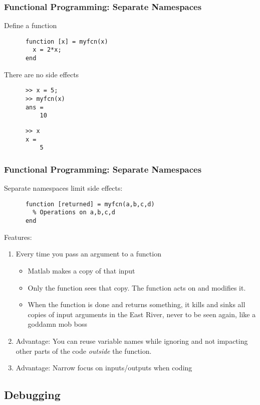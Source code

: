\documentclass{beamer}
\begin{document}
  \begin{frame}[fragile]
    \frametitle{Functional Programming: Separate Namespaces}

    Define a function
    \begin{lstlisting}
      function [x] = myfcn(x)
        x = 2*x;
      end
    \end{lstlisting}\pause
    There are no side effects
    \begin{lstlisting}
      >> x = 5;
      >> myfcn(x)
      ans =
          10
    \end{lstlisting}\pause
    \begin{lstlisting}
      >> x
      x =
          5
    \end{lstlisting}
	\end{frame}

  \begin{frame}[fragile]
    \frametitle{Functional Programming: Separate Namespaces}

    Separate namespaces limit side effects:
    \begin{lstlisting}
      function [returned] = myfcn(a,b,c,d)
        % Operations on a,b,c,d
      end
    \end{lstlisting}
    Features:
    \begin{enumerate}
      \item Every time you pass an argument to a function
      \begin{itemize}
        \item Matlab makes a copy of that input\pause
        \item Only the function sees that copy. The function acts on
          and modifies it.\pause
        \item When the function is done and returns something, it
          kills and sinks all copies of input arguments in the East
          River, never to be seen again, like a goddamn mob boss
      \end{itemize}
      \item Advantage: You can reuse variable names while ignoring and
        not impacting other parts of the code \emph{outside} the
        function.\pause
      \item Advantage: Narrow focus on inputs/outputs when coding
    \end{enumerate}
	\end{frame}


\subsection{Debugging}
\end{document}
